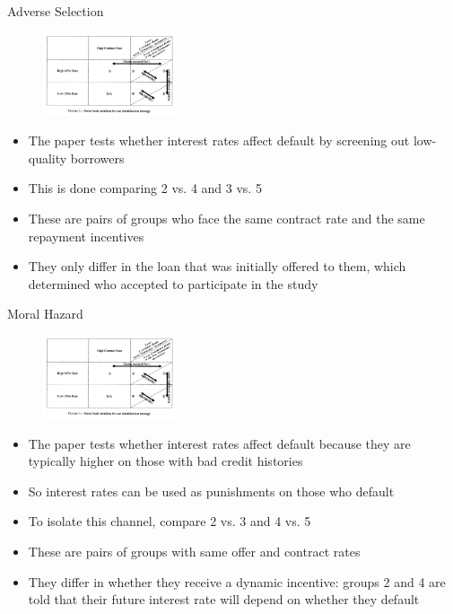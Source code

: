 \documentclass[11pt,notes=hide,aspectratio=169,mathserif]{beamer}
\begin{document}
\begin{frame}{Adverse Selection}
\begin{figure}
    \centering
    \includegraphics[width=0.35\textwidth]{inputs/main.png}
\end{figure}
\begin{itemize}
    \item The paper tests whether interest rates affect default by screening out low-quality borrowers
    \item This is done comparing 2 vs. 4 and 3 vs. 5
    \item These are pairs of groups who face the same contract rate and the same repayment incentives
    \item They only differ in the loan that was initially offered to them, which determined who accepted to participate in the study
\end{itemize}
\end{frame}

\begin{frame}{Moral Hazard}
\begin{figure}
    \centering
    \includegraphics[width=0.35\textwidth]{inputs/main.png}
\end{figure}
\begin{itemize}
    \item The paper tests whether interest rates affect default because they are typically higher on those with bad credit histories
    \item So interest rates can be used as punishments on those who default
    \item To isolate this channel, compare 2 vs. 3 and 4 vs. 5
    \item These are pairs of groups with same offer and contract rates
    \item They differ in whether they receive a dynamic incentive: groups 2 and 4 are told that their future interest rate will depend on whether they default
\end{itemize}
\end{frame}
\end{document}
